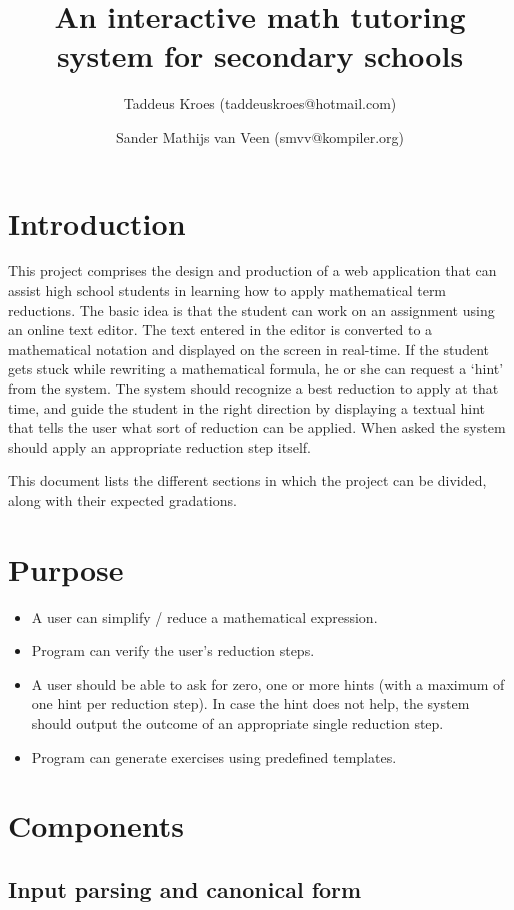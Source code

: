 \documentclass[10pt,a4paper]{article}
\title{An interactive math tutoring system for secondary schools}
\author{Taddeus Kroes (taddeuskroes@hotmail.com)
    \and Sander Mathijs van Veen (smvv@kompiler.org)}
\begin{document}
\maketitle

\section{Introduction}

This project comprises the design and production of a web application that can
assist high school students in learning how to apply mathematical term
reductions. The basic idea is that the student can work on an assignment using
an online text editor. The text entered in the editor is converted to a
mathematical notation and displayed on the screen in real-time. If the student
gets stuck while rewriting a mathematical formula, he or she can request a
`hint' from the system. The system should recognize a best reduction to apply
at that time, and guide the student in the right direction by displaying a
textual hint that tells the user what sort of reduction can be applied. When
asked the system should apply an appropriate reduction step itself.

This document lists the different sections in which the project can be divided,
along with their expected gradations.

\section{Purpose}

\begin{itemize}
    \item A user can simplify / reduce a mathematical expression.
    \item Program can verify the user's reduction steps.
    \item A user should be able to ask for zero, one or more hints (with a
    maximum of one hint per reduction step). In case the hint does not help,
    the system should output the outcome of an appropriate single reduction
    step.
    \item Program can generate exercises using predefined templates.
\end{itemize}

\section{Components}

\subsection{Input parsing and canonical form}
\end{document}
